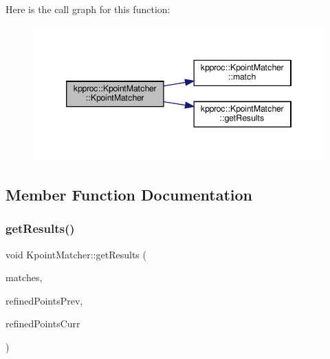 Here is the call graph for this function\+:\nopagebreak
\begin{figure}[H]
\begin{center}
\leavevmode
\includegraphics[width=346pt]{classkpproc_1_1KpointMatcher_a4a40c73477a60c38e5f12ed6f204ab9a_cgraph}
\end{center}
\end{figure}


\subsection{Member Function Documentation}
\mbox{\label{classkpproc_1_1KpointMatcher_a02f6944a8401a2a14bb5ce42073389b0}} 
\subsubsection{\texorpdfstring{get\+Results()}{getResults()}}
{\footnotesize\ttfamily void Kpoint\+Matcher\+::get\+Results (\begin{DoxyParamCaption}\item[{std\+::vector$<$ cv\+::\+D\+Match $>$ \&}]{matches,  }\item[{std\+::vector$<$ cv\+::\+Point2f $>$ \&}]{refined\+Points\+Prev,  }\item[{std\+::vector$<$ cv\+::\+Point2f $>$ \&}]{refined\+Points\+Curr }\end{DoxyParamCaption})}

